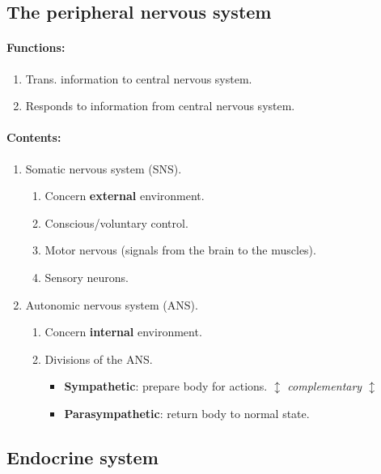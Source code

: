 \documentclass{article}
\begin{document}
	\subsection{The peripheral nervous system}
	\paragraph{Functions:}
	\begin{enumerate}[label=\roman*).]
		\item Trans. information to central nervous system.
		\item Responds to information from central nervous system.
	\end{enumerate}

	\paragraph{Contents:}
	\begin{enumerate}[label=\roman*).]
		\item Somatic nervous system (SNS).
			\begin{enumerate}[label=\alph*).]
				\item Concern \textbf{external} environment.
				\item Conscious/voluntary control.
				\item Motor nervous (signals from the brain to the muscles).
				\item Sensory neurons.
			\end{enumerate}
		\item Autonomic nervous system (ANS).
			\begin{enumerate}[label=\alph*).]
				\item Concern \textbf{internal} environment.
				\item Divisions of the ANS.
				\begin{itemize}
					\item \textbf{Sympathetic}: prepare body for actions.
						\newline $\updownarrow$ \emph{complementary} $\updownarrow$	
					\item \textbf{Parasympathetic}: return body to normal state.
				\end{itemize}
			\end{enumerate}	
	\end{enumerate}
	\subsection{Endocrine system}
\end{document}
